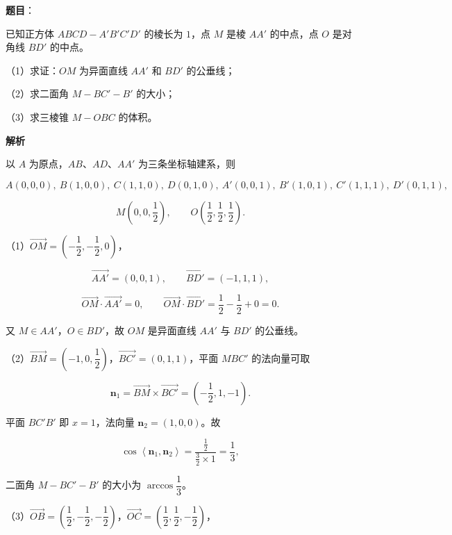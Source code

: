 \begin{answer}

\textbf{题目}：

已知正方体 $ABCD-A'B'C'D'$ 的棱长为 $1$，点 $M$ 是棱 $AA'$ 的中点，点 $O$ 是对角线 $BD'$ 的中点。

（1）求证：$OM$ 为异面直线 $AA'$ 和 $BD'$ 的公垂线；

（2）求二面角 $M-BC'-B'$ 的大小；

（3）求三棱锥 $M-OBC$ 的体积。
\nopagebreak[4]
\begin{center}\end{center}
\nopagebreak[4]
\textbf{解析}

以 $A$ 为原点，$AB$、$AD$、$AA'$ 为三条坐标轴建系，则

\nopagebreak[4]
\[A(0,0,0),\ B(1,0,0),\ C(1,1,0),\ D(0,1,0),\ A'(0,0,1),\ B'(1,0,1),\ C'(1,1,1),\ D'(0,1,1),\]

\nopagebreak[4]
\[M\left(0,0,\frac12\right),\qquad O\left(\frac12,\frac12,\frac12\right).\]

（1）$\overrightarrow{OM}=\left(-\dfrac12,-\dfrac12,0\right)$，

\nopagebreak[4]
\[\overrightarrow{AA'}=(0,0,1),\qquad \overrightarrow{BD'}=(-1,1,1),\]

\nopagebreak[4]
\[\overrightarrow{OM}\cdot\overrightarrow{AA'}=0,\qquad \overrightarrow{OM}\cdot\overrightarrow{BD'}=\frac12-\frac12+0=0.\]

又 $M\in AA'$，$O\in BD'$，故 $OM$ 是异面直线 $AA'$ 与 $BD'$ 的公垂线。

（2）$\overrightarrow{BM}=\left(-1,0,\dfrac12\right)$，$\overrightarrow{BC'}=(0,1,1)$，平面 $MBC'$ 的法向量可取

\nopagebreak[4]
\[\boldsymbol n_1=\overrightarrow{BM}\times\overrightarrow{BC'}=\left(-\frac12,1,-1\right).\]

平面 $BC'B'$ 即 $x=1$，法向量 $\boldsymbol n_2=(1,0,0)$。故

\nopagebreak[4]
\[\cos\left\langle\boldsymbol n_1,\boldsymbol n_2\right\rangle=\frac{\frac12}{\frac32\times1}=\frac13,\]

二面角 $M-BC'-B'$ 的大小为 $\arccos\dfrac13$。

（3）$\overrightarrow{OB}=\left(\dfrac12,-\dfrac12,-\dfrac12\right)$，$\overrightarrow{OC}=\left(\dfrac12,\dfrac12,-\dfrac12\right)$，


\end{answer}
